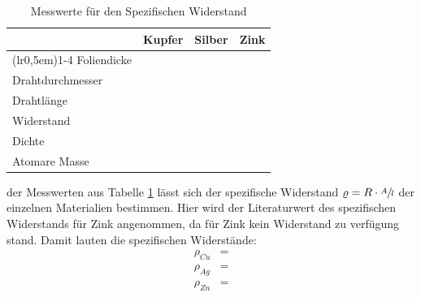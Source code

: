 \begin{table}[H]
\centering
    \begin{tabular}{l r r r}
    \toprule
        \multicolumn{1}{c}{} & \multicolumn{1}{c}{Kupfer} & \multicolumn{1}{c}{Silber} & \multicolumn{1}{c}{Zink}\\
        \cmidrule(lr{0,5em}){1-4}
        Foliendicke         & \text{}   & \text{}   & \text{}\\
        Drahtdurchmesser    & \text{}   & \text{}   & \text{}\\
        Drahtlänge          & \text{}         & \text{}         & \text{}\\
        Widerstand          & \text{}         & \text{}         & \text{}\\
        Dichte              & \text{}    & \text{}    & \text{}\\
        Atomare Masse       & \text{} & \text{} & \text{}\\
        \bottomrule
    \end{tabular}
\caption{Messwerte für den Spezifischen Widerstand}
\label{tab:1}
\end{table}

\justifying der Messwerten aus Tabelle \ref{tab:1} lässt sich der spezifische Widerstand $\varrho = R \cdot \sfrac{A}{l}$
der einzelnen Materialien bestimmen. Hier wird der Literaturwert des spezifischen Widerstands für Zink \cite{SpWiderstand_Zn} angenommen, da für 
Zink kein Widerstand zu verfügung stand. Damit lauten die spezifischen Widerstände:
\begin{subequations} \label{eq:15}
\begin{align}
    \rho_{Cu} &= \text{} \label{eq:15a}\\
    \rho_{Ag} &= \text{} \label{eq:15b}\\
    \rho_{Zn} &= \text{} \label{eq:15c}
\end{align}
\end{subequations}



